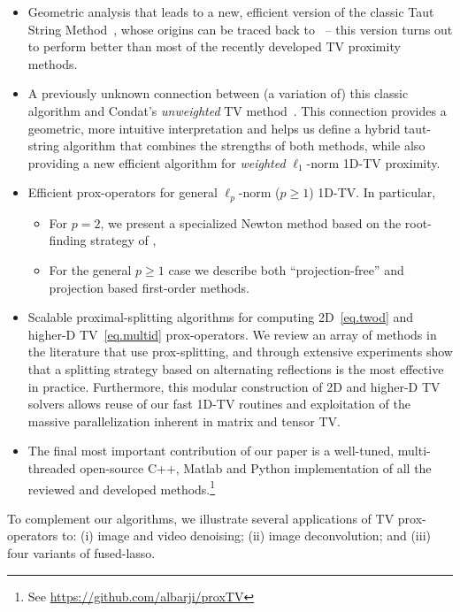 \documentclass[twoside,11pt]{article}
\numberwithin{equation}{section}
\numberwithin{theorem}{section}
\begin{document}
\begin{itemize}
  \setlength{\itemsep}{-1pt}
\item Geometric analysis that leads to a new, efficient version of the classic Taut String Method~\citep{daviesTautString}, whose origins can be traced back to~\citep{Barlow} -- this version turns out to perform better than most of the recently developed TV proximity methods.
\item A previously unknown connection between (a variation of) this classic algorithm and Condat's \emph{unweighted} TV method~\citep{fastTV}. This connection provides a geometric, more intuitive interpretation and helps us define a hybrid taut-string algorithm that combines the strengths of both methods, while also providing a new efficient algorithm for \emph{weighted} $\ell_1$-norm 1D-TV proximity.
\item Efficient prox-operators for general $\ell_p$-norm ($p \ge 1$) 1D-TV. In particular,
  \begin{itemize}
    \vspace*{-4pt}
    \setlength{\itemsep}{-1pt}
  \item For $p=2$, we present a specialized Newton method based on the root-finding strategy of \cite{More83},
  \item For the general $p \geq 1$ case we describe both ``projection-free'' and projection based first-order methods.
  \end{itemize}
\item Scalable proximal-splitting algorithms for computing 2D~\eqref{eq.twod} and higher-D TV~\eqref{eq.multid} prox-operators. We review an array of methods in the literature that use prox-splitting, and through extensive experiments show that a splitting strategy based on alternating reflections is the most effective in practice. Furthermore, this modular construction of 2D and higher-D TV solvers allows reuse of our fast 1D-TV routines and exploitation of the massive parallelization inherent in matrix and tensor TV.
\item The final most important contribution of our paper is a well-tuned, multi-threaded open-source C++, Matlab and Python implementation of all the reviewed and developed methods.\footnote{See \href{https://github.com/albarji/proxTV}{{https://github.com/albarji/proxTV}}}
\end{itemize}

\noindent To complement our algorithms, we illustrate several applications of TV prox-operators to: (i) image and video denoising; (ii) image deconvolution; and (iii) four variants of fused-lasso.
\end{document}
